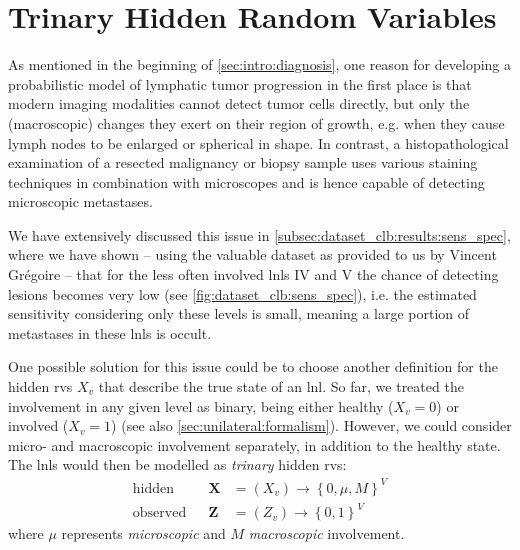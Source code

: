 \documentclass[\relativeRoot/main.tex]{subfiles}
\begin{document}
\section{Trinary Hidden Random Variables}
\label{sec:future:trinary}

As mentioned in the beginning of \cref{sec:intro:diagnosis}, one reason for developing a probabilistic model of lymphatic tumor progression in the first place is that modern imaging modalities cannot detect tumor cells directly, but only the (macroscopic) changes they exert on their region of growth, e.g. when they cause lymph nodes to be enlarged or spherical in shape. In contrast, a histopathological examination of a resected malignancy or biopsy sample uses various staining techniques in combination with microscopes and is hence capable of detecting microscopic metastases.

We have extensively discussed this issue in \cref{subsec:dataset_clb:results:sens_spec}, where we have shown -- using the valuable dataset as provided to us by Vincent Grégoire \cite{bauwens_prevalence_2021} -- that for the less often involved \glspl{lnl} IV and V the chance of detecting lesions becomes very low (see \cref{fig:dataset_clb:sens_spec}), i.e. the estimated sensitivity considering only these levels is small, meaning a large portion of metastases in these \glspl{lnl} is occult.

One possible solution for this issue could be to choose another definition for the hidden \glspl{rv} $X_v$ that describe the true state of an \gls{lnl}. So far, we treated the involvement in any given level as binary, being either healthy ($X_v=0$) or involved ($X_v=1$) (see also \cref{sec:unilateral:formalism}). However, we could consider micro- and macroscopic involvement separately, in addition to the healthy state. The \glspl{lnl} would then be modelled as \emph{trinary} hidden \glspl{rv}:
%
\begin{equation}
    \begin{aligned}
        \text{hidden}& & \mathbf{X} &= \left( X_v \right) \rightarrow \left\{ 0, \mu, M \right\}^V \\
        \text{observed}& & \mathbf{Z} &= \left( Z_v \right) \rightarrow \left\{ 0,1 \right\}^V
    \end{aligned}
\end{equation}
%
where $\mu$ represents \emph{microscopic} and $M$ \emph{macroscopic} involvement.
\end{document}
